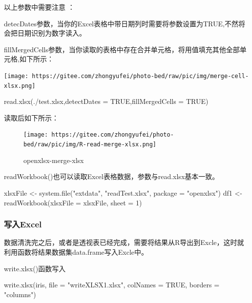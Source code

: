 \documentclass[
]{book}
\newenvironment{Shaded}{\begin{snugshade}}{\end{snugshade}}
\newcommand{\AttributeTok}[1]{\textcolor[rgb]{0.77,0.63,0.00}{#1}}
\newcommand{\ConstantTok}[1]{\textcolor[rgb]{0.00,0.00,0.00}{#1}}
\newcommand{\DecValTok}[1]{\textcolor[rgb]{0.00,0.00,0.81}{#1}}
\newcommand{\FunctionTok}[1]{\textcolor[rgb]{0.00,0.00,0.00}{#1}}
\newcommand{\NormalTok}[1]{#1}
\newcommand{\OtherTok}[1]{\textcolor[rgb]{0.56,0.35,0.01}{#1}}
\newcommand{\StringTok}[1]{\textcolor[rgb]{0.31,0.60,0.02}{#1}}
\begin{document}
以上参数中需要注意 ：

detecDates参数，当你的Excel表格中带日期列时需要将参数设置为TRUE,不然将会把日期识别为数字读入。

fillMergedCells参数，当你读取的表格中存在合并单元格，将用值填充其他全部单元格,如下所示：

\texttt{[image: https://gitee.com/zhongyufei/photo-bed/raw/pic/img/merge-cell-xlsx.png]}

\begin{Shaded}
\begin{Highlighting}[]
\FunctionTok{read.xlsx}\NormalTok{(}\StringTok{\textquotesingle{}./test.xlsx\textquotesingle{}}\NormalTok{,}\AttributeTok{detectDates =} \ConstantTok{TRUE}\NormalTok{,}\AttributeTok{fillMergedCells =} \ConstantTok{TRUE}\NormalTok{)}
\end{Highlighting}
\end{Shaded}

读取后如下所示：

\begin{figure}
\centering
\texttt{[image: https://gitee.com/zhongyufei/photo-bed/raw/pic/img/R-read-merge-xlsx.png]}
\caption{openxlsx-merge-xlsx}
\end{figure}

readWorkbook()也可以读取Excel表格数据，参数与read.xlsx基本一致。

\begin{Shaded}
\begin{Highlighting}[]
\NormalTok{xlsxFile }\OtherTok{\textless{}{-}} \FunctionTok{system.file}\NormalTok{(}\StringTok{"extdata"}\NormalTok{, }\StringTok{"readTest.xlsx"}\NormalTok{, }\AttributeTok{package =} \StringTok{"openxlsx"}\NormalTok{)}
\NormalTok{df1 }\OtherTok{\textless{}{-}} \FunctionTok{readWorkbook}\NormalTok{(}\AttributeTok{xlsxFile =}\NormalTok{ xlsxFile, }\AttributeTok{sheet =} \DecValTok{1}\NormalTok{)}
\end{Highlighting}
\end{Shaded}

\hypertarget{ux5199ux5165excel}{%
\subsubsection{写入Excel}\label{ux5199ux5165excel}}

数据清洗完之后，或者是透视表已经完成，需要将结果从R导出到Excle，这时就利用函数将结果数据集data.frame写入Excle中。

write.xlsx()函数写入

\begin{Shaded}
\begin{Highlighting}[]
\FunctionTok{write.xlsx}\NormalTok{(iris, }\AttributeTok{file =} \StringTok{"writeXLSX1.xlsx"}\NormalTok{, }\AttributeTok{colNames =} \ConstantTok{TRUE}\NormalTok{, }\AttributeTok{borders =} \StringTok{"columns"}\NormalTok{)}
\end{Highlighting}
\end{Shaded}
\end{document}
